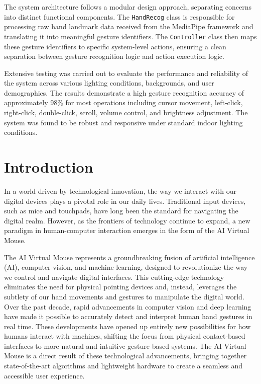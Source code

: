\documentclass[12pt,a4paper]{report}
\begin{document}
The system architecture follows a modular design approach, separating concerns into
distinct functional components. The \texttt{HandRecog} class is responsible for processing
raw hand landmark data received from the MediaPipe framework and translating it into
meaningful gesture identifiers. The \texttt{Controller} class then maps these gesture
identifiers to specific system-level actions, ensuring a clean separation between gesture
recognition logic and action execution logic.

Extensive testing was carried out to evaluate the performance and reliability of the
system across various lighting conditions, backgrounds, and user demographics. The
results demonstrate a high gesture recognition accuracy of approximately 98\% for most
operations including cursor movement, left-click, right-click, double-click, scroll,
volume control, and brightness adjustment. The system was found to be robust and
responsive under standard indoor lighting conditions.


\newpage

\tableofcontents

\chapter{Introduction}

In a world driven by technological innovation, the way we interact with our digital devices
plays a pivotal role in our daily lives. Traditional input devices, such as mice and touchpads,
have long been the standard for navigating the digital realm. However, as the frontiers of
technology continue to expand, a new paradigm in human-computer interaction emerges in the
form of the AI Virtual Mouse.

The AI Virtual Mouse represents a groundbreaking fusion of artificial intelligence (AI),
computer vision, and machine learning, designed to revolutionize the way we control and
navigate digital interfaces. This cutting-edge technology eliminates the need for physical
pointing devices and, instead, leverages the subtlety of our hand movements and gestures to
manipulate the digital world.
Over the past decade, rapid advancements in computer vision and deep learning have
made it possible to accurately detect and interpret human hand gestures in real time.
These developments have opened up entirely new possibilities for how humans interact
with machines, shifting the focus from physical contact-based interfaces to more natural
and intuitive gesture-based systems. The AI Virtual Mouse is a direct result of these
technological advancements, bringing together state-of-the-art algorithms and lightweight
hardware to create a seamless and accessible user experience.
\end{document}
